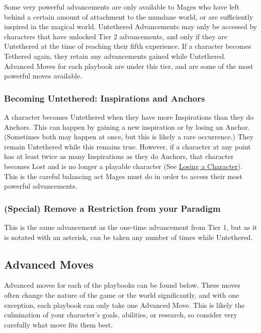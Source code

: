 \documentclass[10pt,twoside,openright]{memoir}
\begin{document}
Some very powerful advancements are only available to Mages who have
left behind a certain amount of attachment to the mundane world, or are
sufficiently inspired in the magical world. Untethered Advancements may
only be accessed by characters that have unlocked Tier 2 advancements,
and only if they are Untethered at the time of reaching their fifth
experience. If a character becomes Tethered again, they retain any
advancements gained while Untethered. Advanced Moves for each playbook
are under this tier, and are some of the most powerful moves available.

\hypertarget{becoming-untethered-inspirations-and-anchors}{%
\subsubsection{Becoming Untethered: Inspirations and
Anchors}\label{becoming-untethered-inspirations-and-anchors}}

A character becomes Untethered when they have more Inspirations than
they do Anchors. This can happen by gaining a new inspiration or by
losing an Anchor. (Sometimes both may happen at once, but this is likely
a rare occurrence.) They remain Untethered while this remains true.
However, if a character at any point has at least twice as many
Inspirations as they do Anchors, that character becomes Lost and is no
longer a playable character (See
\href{AnchorsandInspirationsLosingACharacter}{Losing a Character}). This
is the careful balancing act Mages must do in order to access their most
powerful advancements.

\hypertarget{special-remove-a-restriction-from-your-paradigm}{%
\subsubsection{(Special) Remove a Restriction from your
Paradigm}\label{special-remove-a-restriction-from-your-paradigm}}

This is the same advancement as the one-time advancement from Tier 1,
but as it is notated with an asterisk, can be taken any number of times
while Untethered.

\label{Advanced Moves}

\hypertarget{advanced-moves-1}{%
\subsection{Advanced Moves}\label{advanced-moves-1}}

Advanced moves for each of the playbooks can be found below. These moves
often change the nature of the game or the world significantly, and with
one exception, each playbook can only take one Advanced Move. This is
likely the culmination of your character's goals, abilities, or
research, so consider very carefully what move fits them best.
\end{document}
